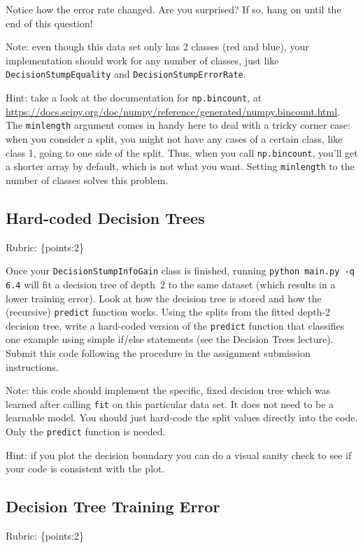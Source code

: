 \documentclass{article}
\def\rubric#1{\gre{Rubric: \{#1\}}}{}
\def\blu#1{{\color{blu}#1}}
\def\gre#1{{\color{gre}#1}}
\begin{document}
	Notice how the error rate changed. Are you surprised? If so, hang on until the end of this question!

	Note: even though this data set only has 2 classes (red and blue), your implementation should work
	for any number of classes, just like \texttt{DecisionStumpEquality} and \texttt{DecisionStumpErrorRate}.

	Hint: take a look at the documentation for \texttt{np.bincount}, at \\
	\url{https://docs.scipy.org/doc/numpy/reference/generated/numpy.bincount.html}.
	The \texttt{minlength} argument comes in handy here to deal with a tricky corner case:
	when you consider a split, you might not have any cases of a certain class, like class 1,
	going to one side of the split. Thus, when you call \texttt{np.bincount}, you'll get
	a shorter array by default, which is not what you want. Setting \texttt{minlength} to the
	number of classes solves this problem.

	\subsection{Hard-coded Decision Trees}
	\rubric{points:2}

	Once your \texttt{DecisionStumpInfoGain} class is finished, running \texttt{python main.py -q 6.4} will fit
	a decision tree of depth~2 to the same dataset (which results in a lower training error).
	Look at how the decision tree is stored and how the (recursive) \texttt{predict} function works.
	\blu{Using the splits from the fitted depth-2 decision tree, write a hard-coded version of the \texttt{predict}
		function that classifies one example using simple if/else statements
		(see the Decision Trees lecture). Submit this code following the procedure in the assignment submission instructions.}

	Note: this code should implement the specific, fixed decision tree
	which was learned after calling \texttt{fit} on this particular data set. It does not need to be a learnable model.
	You should just hard-code the split values directly into the code.
	Only the \texttt{predict} function is needed.

	Hint: if you plot the decision boundary you can do a visual sanity check to see if your code is consistent with the plot.





	\subsection{Decision Tree Training Error}
	\rubric{points:2}
\end{document}
